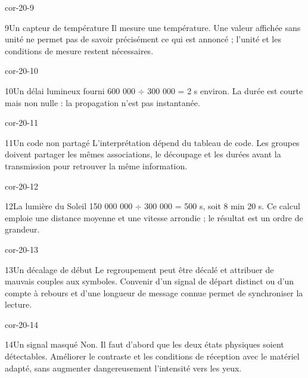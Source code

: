 \documentclass[12pt,twoside,openany]{book}
\begin{document}
\begin{blocLivre}{cor-20-9}
\begin{corrige}{9}{Un capteur de température}
Il mesure une température. Une valeur affichée sans unité ne permet pas de savoir précisément ce qui est annoncé ; l’unité et les conditions de mesure restent nécessaires.\par
\end{corrige}\end{blocLivre}
\begin{blocLivre}{cor-20-10}
\begin{corrige}{10}{Un délai lumineux fourni}
600 000 \(\div\) 300 000 = 2 s environ. La durée est courte mais non nulle : la propagation n’est pas instantanée.\par
\end{corrige}\end{blocLivre}
\begin{blocLivre}{cor-20-11}
\begin{corrige}{11}{Un code non partagé}
L’interprétation dépend du tableau de code. Les groupes doivent partager les mêmes associations, le découpage et les durées avant la transmission pour retrouver la même information.\par
\end{corrige}\end{blocLivre}
\begin{blocLivre}{cor-20-12}
\begin{corrige}{12}{La lumière du Soleil}
150 000 000 \(\div\) 300 000 = 500 s, soit 8 min 20 s. Ce calcul emploie une distance moyenne et une vitesse arrondie ; le résultat est un ordre de grandeur.\par
{}
\end{corrige}\end{blocLivre}
\begin{blocLivre}{cor-20-13}
\begin{corrige}{13}{Un décalage de début}
Le regroupement peut être décalé et attribuer de mauvais couples aux symboles. Convenir d’un signal de départ distinct ou d’un compte à rebours et d’une longueur de message connue permet de synchroniser la lecture.\par
\end{corrige}\end{blocLivre}
\begin{blocLivre}{cor-20-14}
\begin{corrige}{14}{Un signal masqué}
Non. Il faut d’abord que les deux états physiques soient détectables. Améliorer le contraste et les conditions de réception avec le matériel adapté, sans augmenter dangereusement l’intensité vers les yeux.\par
\end{corrige}\end{blocLivre}
\end{document}
